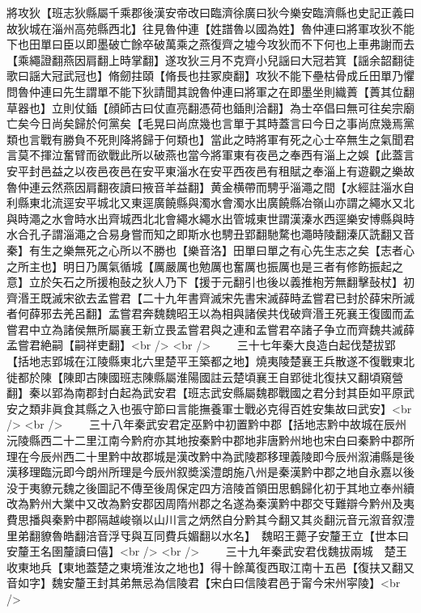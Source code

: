 將攻狄【班志狄縣屬千乘郡後漢安帝改曰臨濟徐廣曰狄今樂安臨濟縣也史記正義曰故狄城在淄州高苑縣西北】往見魯仲連【姓譜魯以國為姓】魯仲連曰將軍攻狄不能下也田單曰臣以即墨破亡餘卒破萬乘之燕復齊之墟今攻狄而不下何也上車弗謝而去【乘繩證翻燕因肩翻上時掌翻】遂攻狄三月不克齊小兒謡曰大冠若箕【謡余韶翻徒歌曰謡大冠武冠也】脩劒拄頤【脩長也拄冢庾翻】攻狄不能下壘枯骨成丘田單乃懼問魯仲連曰先生謂單不能下狄請聞其說魯仲連曰將軍之在即墨坐則織蕢【蕢其位翻草器也】立則仗鍤【顔師古曰仗直亮翻憑荷也鍤則洽翻】為士卒倡曰無可往矣宗廟亡矣今日尚矣歸於何黨矣【毛晃曰尚庶幾也言單于其時蓋言曰今日之事尚庶幾焉黨類也言戰有勝負不死則降將歸于何類也】當此之時將軍有死之心士卒無生之氣聞君言莫不揮泣奮臂而欲戰此所以破燕也當今將軍東有夜邑之奉西有淄上之娛【此蓋言安平封邑益之以夜邑夜邑在安平東淄水在安平西夜邑有租賦之奉淄上有遊觀之樂故魯仲連云然燕因肩翻夜讀曰掖音羊益翻】黄金横帶而騁乎淄澠之間【水經註淄水自利縣東北流逕安平城北又東逕廣饒縣與濁水會濁水出廣饒縣冶嶺山亦謂之繩水又北與時澠之水會時水出齊城西北北會繩水繩水出管城東世謂漢溱水西逕樂安博縣與時水合孔子謂淄澠之合易身嘗而知之即斯水也騁丑郢翻馳騖也澠時陵翻溱仄詵翻又音秦】有生之樂無死之心所以不勝也【樂音洛】田單曰單之有心先生志之矣【志者心之所主也】明日乃厲氣循城【厲嚴厲也勉厲也奮厲也振厲也是三者有修飭振起之意】立於矢石之所援枹鼔之狄人乃下【援于元翻引也後以義推枹芳無翻擊鼔杖】初齊湣王既滅宋欲去孟嘗君【二十九年書齊滅宋先書宋滅薛時孟嘗君已封於薛宋所滅者何薛邪去羌呂翻】孟嘗君奔魏魏昭王以為相與諸侯共伐破齊湣王死襄王復國而孟嘗君中立為諸侯無所屬襄王新立畏孟嘗君與之連和孟嘗君卒諸子争立而齊魏共滅薛孟嘗君絶嗣【嗣祥吏翻】<br />
<br />
　　三十七年秦大良造白起伐楚拔郢【括地志郢城在江陵縣東北六里楚平王築都之地】燒夷陵楚襄王兵散遂不復戰東北徙都於陳【陳即古陳國班志陳縣屬淮陽國註云楚頃襄王自郢徙北復扶又翻頃窺營翻】秦以郢為南郡封白起為武安君【班志武安縣屬魏郡戰國之君分封其臣如平原武安之類非眞食其縣之入也張守節曰言能撫養軍士戰必克得百姓安集故曰武安】<br />
<br />
　　三十八年秦武安君定巫黔中初置黔中郡【括地志黔中故城在辰州沅陵縣西二十二里江南今黔府亦其地按秦黔中郡地非唐黔州地也宋白曰秦黔中郡所理在今辰州西二十里黔中故郡城是漢改黔中為武陵郡移理義陵即今辰州溆浦縣是後漢移理臨沅即今朗州所理是今辰州叙奬溪澧朗施八州是秦漢黔中郡之地自永嘉以後没于夷䝤元魏之後圖記不傳至後周保定四方涪陵首領田思鶴歸化初于其地立奉州續改為黔州大業中又改為黔安郡因周隋州郡之名遂為秦漢黔中郡交㸦難辯今黔州及夷費思播與秦黔中郡隔越峻嶺以山川言之炳然自分黔其今翻又其炎翻沅音元溆音叙澧里弟翻䝤魯皓翻涪音浮㸦與互同費兵媚翻以水名】　魏昭王薨子安釐王立【世本曰安釐王名圉釐讀曰僖】<br />
<br />
　　三十九年秦武安君伐魏拔兩城　楚王收東地兵【東地蓋楚之東境淮汝之地也】得十餘萬復西取江南十五邑【復扶又翻又音如字】魏安釐王封其弟無忌為信陵君【宋白曰信陵君邑于甯今宋州寜陵】<br />
